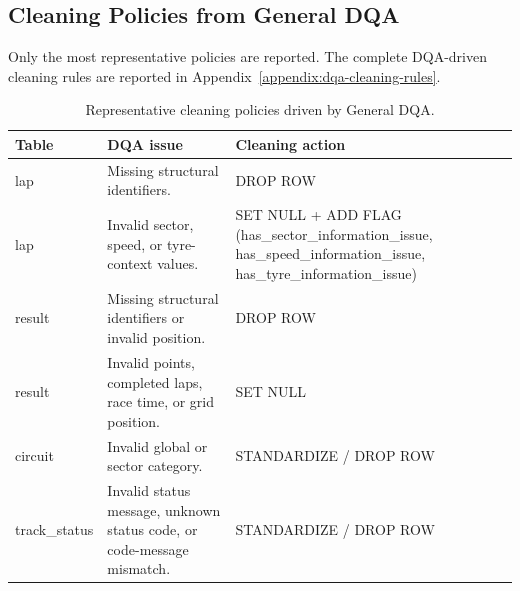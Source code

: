 \documentclass[11pt,a4paper]{article}
\begin{document}
	\subsection{Cleaning Policies from General DQA}
	
	Only the most representative policies are reported. The complete DQA-driven cleaning rules are reported in Appendix~\ref{appendix:dqa-cleaning-rules}.
	
	
	\begin{table}[H]
		\centering
		\small
		\caption{Representative cleaning policies driven by General DQA.}
		\label{tab:dqa-cleaning-examples}
		\begin{tabular}{
				>{\centering\arraybackslash}m{2cm}
				>{\raggedright\arraybackslash}m{9.1cm}
				>{\raggedright\arraybackslash}m{5cm}
			}
			\toprule
			\textbf{Table}
			& \textbf{DQA issue}
			& \textbf{Cleaning action} \\
			\midrule
			
			lap
			& Missing structural identifiers.
			& DROP ROW \\
			
			\midrule
			
			lap
			& Invalid sector, speed, or tyre-context values.
			& SET NULL + ADD FLAG 
			{\scriptsize
				(has\_sector\_information\_issue, 
				has\_speed\_information\_issue, 
				has\_tyre\_information\_issue)} \\
			
			\midrule
			
			result
			& Missing structural identifiers or invalid position.
			& DROP ROW \\
			
			\midrule
			
			result
			& Invalid points, completed laps, race time, or grid position.
			& SET NULL \\
			
			\midrule
			
			circuit
			& Invalid global or sector category.
			& STANDARDIZE / DROP ROW \\
			
			\midrule
			
			track\_status
			& Invalid status message, unknown status code, or code-message mismatch.
			& STANDARDIZE / DROP ROW \\
			
			\bottomrule
		\end{tabular}
	\end{table}
	
\end{document}
